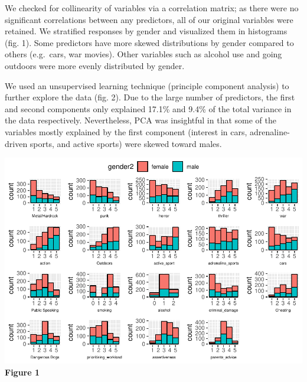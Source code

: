 \documentclass[]{article}
\newenvironment{Shaded}{\begin{snugshade}}{\end{snugshade}}
\newcommand{\KeywordTok}[1]{\textcolor[rgb]{0.13,0.29,0.53}{\textbf{#1}}}
\newcommand{\DataTypeTok}[1]{\textcolor[rgb]{0.13,0.29,0.53}{#1}}
\newcommand{\DecValTok}[1]{\textcolor[rgb]{0.00,0.00,0.81}{#1}}
\newcommand{\StringTok}[1]{\textcolor[rgb]{0.31,0.60,0.02}{#1}}
\newcommand{\OtherTok}[1]{\textcolor[rgb]{0.56,0.35,0.01}{#1}}
\newcommand{\OperatorTok}[1]{\textcolor[rgb]{0.81,0.36,0.00}{\textbf{#1}}}
\newcommand{\NormalTok}[1]{#1}
\begin{document}
We checked for collinearity of variables via a correlation matrix; as
there were no significant correlations between any predictors, all of
our original variables were retained. We stratified responses by gender
and visualized them in histograms (fig. 1). Some predictors have more
skewed distributions by gender compared to others (e.g.~cars, war
movies). Other variables such as alcohol use and going outdoors were
more evenly distributed by gender.

We used an unsupervised learning technique (principle component
analysis) to further explore the data (fig. 2). Due to the large number
of predictors, the first and second components only explained 17.1\% and
9.4\% of the total variance in the data respectively. Nevertheless, PCA
was insightful in that some of the variables mostly explained by the
first component (interest in cars, adrenaline-driven sports, and active
sports) were skewed toward males.

\includegraphics{final_report_files/figure-latex/unnamed-chunk-1-1.pdf}
\textbf{Figure 1}

\begin{Shaded}
\end{Shaded}
\end{document}
